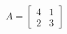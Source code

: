 \documentclass{article}
\begin{document}
\begin{align*}
A = \begin{bmatrix} 4 & 1 \\ 2 & 3 \end{bmatrix}
\end{align*}
\end{document}
